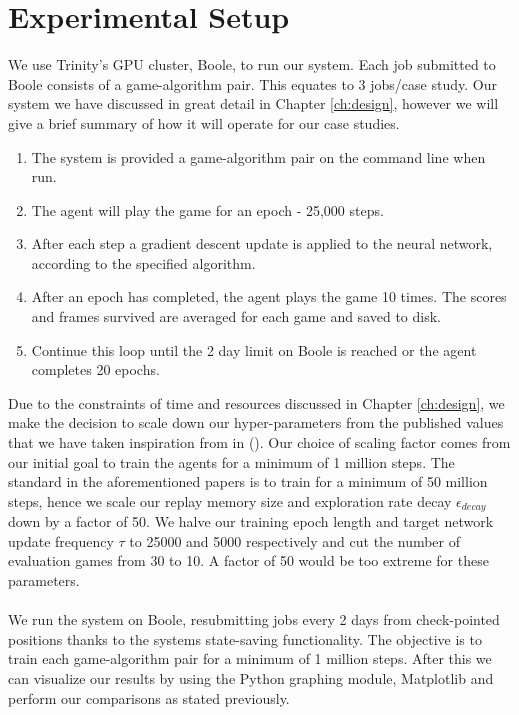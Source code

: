 \section{Experimental Setup} \label{sec:setup}
We use Trinity's GPU cluster, Boole, to run our system. Each job submitted to Boole consists of a
game-algorithm pair. This equates to 3 jobs/case study. Our system we have discussed in great detail
in Chapter \ref{ch:design}, however we will give a brief summary of how it will operate for our case
studies.

\begin{enumerate}
	\item The system is provided a game-algorithm pair on the command line when run.
	\item The agent will play the game for an epoch - 25,000 steps.
	\item After each step a gradient descent update is applied to the neural network, according to
	      the specified algorithm.
	\item After an epoch has completed, the agent plays the game 10 times. The scores and frames
	      survived are averaged for each game and saved to disk.
	\item Continue this loop until the 2 day limit on Boole is reached or the agent completes 20
	      epochs.
\end{enumerate}

Due to the constraints of time and resources discussed in Chapter \ref{ch:design}, we make the decision to scale down our hyper-parameters from the published values that we have taken inspiration from in (\citet{deepmind1,human,doubleq,dueling}). Our choice of scaling factor comes from our initial goal to train the agents for a minimum of 1 million steps. The standard in the aforementioned papers is to train for a minimum of 50 million steps, hence we scale our replay memory size and exploration rate decay $\epsilon_{decay}$ down by a factor of 50. We halve our training epoch length and target network update frequency $\tau$ to 25000 and 5000 respectively and cut the number of evaluation games from 30 to 10. A factor of 50 would be too extreme for these parameters.
\paragraph{}

We run the system on Boole, resubmitting jobs every 2 days from check-pointed positions thanks to
the systems state-saving functionality. The objective is to train each game-algorithm pair for a
minimum of 1 million steps. After this we can visualize our results by using the Python graphing
module, Matplotlib \cite{matplotlib} and perform our comparisons as stated previously.

